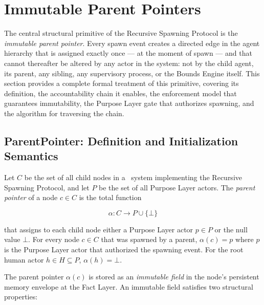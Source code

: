 \section{Immutable Parent Pointers}
\label{sec:immutable-parent-pointers}

The central structural primitive of the Recursive Spawning Protocol is the \textit{immutable parent pointer}. Every spawn event creates a directed edge in the agent hierarchy that is assigned exactly once — at the moment of spawn — and that cannot thereafter be altered by any actor in the system: not by the child agent, its parent, any sibling, any supervisory process, or the Bounds Engine itself. This section provides a complete formal treatment of this primitive, covering its definition, the accountability chain it enables, the enforcement model that guarantees immutability, the Purpose Layer gate that authorizes spawning, and the algorithm for traversing the chain.

\subsection{ParentPointer: Definition and Initialization Semantics}
\label{sec:parent-pointer-definition}

\begin{dfn}
\label{dfn:parent-pointer}
Let $C$ be the set of all child nodes in a \bxthree\ system implementing the Recursive Spawning Protocol, and let $P$ be the set of all Purpose Layer actors. The \emph{parent pointer} of a node $c \in C$ is the total function

\begin{equation}
\alpha : C \rightarrow P \cup \{\bot\}
\end{equation}

that assigns to each child node either a Purpose Layer actor $p \in P$ or the null value $\bot$. For every node $c \in C$ that was spawned by a parent, $\alpha(c) = p$ where $p$ is the Purpose Layer actor that authorized the spawning event. For the root human actor $h \in H \subseteq P$, $\alpha(h) = \bot$.
\end{dfn}

The parent pointer $\alpha(c)$ is stored as an \textit{immutable field} in the node's persistent memory envelope at the Fact Layer. An immutable field satisfies two structural properties:

